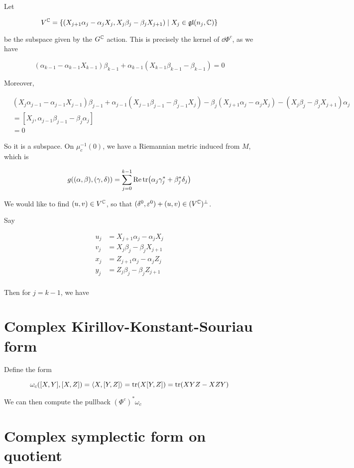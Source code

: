 \documentclass{article}
\begin{document}
Let

\[V^{\mathbb{C}} = \left\{(X_{j+1}\alpha_j - \alpha_jX_j, X_j\beta_j - \beta_jX_{j+1}) \mid X_j \in \mathfrak{g}\mathfrak{l}(n_j, \mathbb{C})\right\}\]

be the subspace given by the \(G^{\mathbb{C}}\) action. This is precisely the kernel of \(\dd\Phi^c\), as we have

\[(\alpha_{k-1} - \alpha_{k-1}X_{k-1})\beta_{k-1} + \alpha_{k-1}(X_{k-1}\beta_{k-1} - \beta_{k-1}) = 0\]

Moreover,

\begin{align*}
    &(X_j\alpha_{j-1} - \alpha_{j-1}X_{j-1})\beta_{j-1} + \alpha_{j-1}(X_{j-1}\beta_{j-1} - \beta_{j-1}X_j) - \beta_j(X_{j+1}\alpha_j - \alpha_jX_j) - (X_j\beta_j - \beta_jX_{j+1})\alpha_j \\
    &= [X_j, \alpha_{j-1}\beta_{j-1} - \beta_j\alpha_j] \\
    &= 0
\end{align*}

So it is a subspace. On \(\mu_c^{-1}(0)\), we have a Riemannian metric induced from \(M\), which is

\[g((\alpha, \beta), (\gamma, \delta)) = \sum_{j=0}^{k-1}\Re\tr(\alpha_j\gamma_j^* + \beta_j^*\delta_j)\]

We would like to find \((u, v) \in V^{\mathbb{C}}\), so that \((\delta^0, \varepsilon^0) + (u, v) \in (V^{\mathbb{C}})^\perp\). 

Say 

\begin{align*}
    u_j &= X_{j+1}\alpha_j - \alpha_jX_j \\
    v_j &= X_j\beta_j - \beta_jX_{j+1} \\
    x_j &= Z_{j+1}\alpha_j - \alpha_jZ_j \\
    y_j &= Z_j\beta_j - \beta_jZ_{j+1} \\
\end{align*}

Then for \(j = k - 1\), we have

\section{Complex Kirillov-Konstant-Souriau form}

Define the form

\[\omega_c([X, Y], [X, Z]) = \left\langle X, [Y, Z] \right\rangle = \tr(X[Y, Z]) = \tr(XYZ - XZY)\]

We can then compute the pullback \((\Phi^c)^*\omega_c\)

\section{Complex symplectic form on quotient}

\printbibliography
\end{document}
